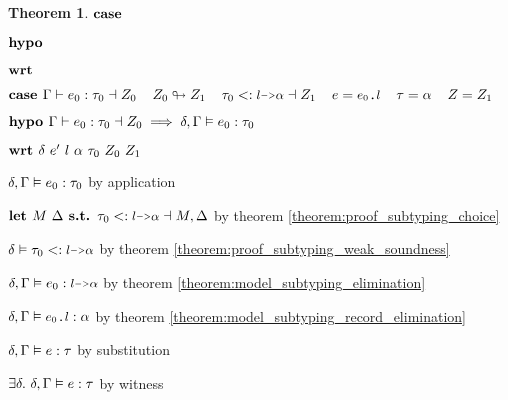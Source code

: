 \documentclass[acmsmall]{acmart}
\theoremstyle{definition}
\newtheorem{theorem}{Theorem}[section]
\begin{document}
\begin{theorem}
  \item \Z {} 
  \item \Z $\textbf{case } $ 
  \item \Z $\textbf{hypo } $ 
  \item \Z $\textbf{wrt } $ 



  \item \Z $\B{case } 
    \Gamma \entails e_0 \hastype \tau_0 \given Z_0
    \I
    Z_0 \looparrowright Z_1
    \I
    \tau_0 \subtypes \J{$l$->$\alpha$} \given Z_1
    \I
    e = \J{$e_0$.$l$} \I \tau = \alpha \I Z = Z_1
  $
   
  \item \Z $\textbf{hypo } 
    \Gamma \vdash e_0 : \tau_0 \dashv Z_0 
    \implies 
    \delta, \Gamma \vDash e_0 : \tau_0
  $ 
  \item \Z $\textbf{wrt } \delta\ e' \ l \ \alpha \ \tau_0 \ Z_0 \ Z_1$ 

    \item \Z\Z $
      \delta, \Gamma \vDash e_0 : \tau_0
    $ by application

    \item \Z\Z $
      \B{let }
      M\ \Delta
      \B{ s.t. }
      \tau_0 \subtypes \J{$l$->$\alpha$} \given M, \Delta
    $ by theorem \ref{theorem:proof_subtyping_choice}


    \item \Z\Z $
      \delta \satisfies \tau_0  \subtypes \J{$l$->$\alpha$}
    $ by theorem \ref{theorem:proof_subtyping_weak_soundness}
    \item \Z\Z $
      \delta, \Gamma \satisfies e_0 \hastype \J{$l$->$\alpha$}
    $ by theorem \ref{theorem:model_subtyping_elimination} 
    \item \Z\Z $
      \delta, \Gamma \satisfies \J{$e_0$.$l$} \hastype \alpha 
    $ by theorem \ref{theorem:model_subtyping_record_elimination} 
    \item \Z\Z $
      \delta, \Gamma \vDash e : \tau
    $ by substitution 
    \item \Z\Z $
      \exists \delta .\ \delta, \Gamma \vDash e : \tau
    $ by witness 



\end{theorem}
\end{document}
